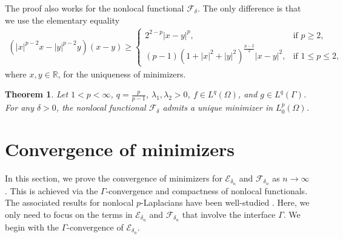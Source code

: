 \documentclass{article}
\newcommand{\R}{\mathbb{R}}
\newtheorem{theorem}{Theorem}
\theoremstyle{definition}
\begin{document}
The proof also works for the nonlocal functional $\mathcal{F}_\delta$.
The only difference is that we use the elementary equality
\begin{align*}
  (|x|^{p-2}x-|y|^{p-2}y)(x-y)\geq
  \begin{cases}
    2^{2-p}|x-y|^p, & \mbox{if } p\geq 2, \\
    (p-1)(1+|x|^2+|y|^2)^{\frac{p-2}{2}}|x-y|^2, & \mbox{if } 1\leq p\leq 2,
  \end{cases}
\end{align*}
where $x,y\in \R$,
for the uniqueness of minimizers.

\begin{theorem}
  Let $1<p<\infty$, $q=\frac{p}{p-1}$, $\lambda_1, \lambda_2>0$, $f\in L^q(\Omega)$, and $g\in L^q(\Gamma)$. For any $\delta>0$, the nonlocal functional $\mathcal{F}_\delta$ admits a unique minimizer in $L^p_0(\Omega)$.
\end{theorem}


\section{Convergence of minimizers}
In this section, we prove the convergence of minimizers for $\mathcal{E}_{\delta_n}$ and $\mathcal{F}_{\delta_n}$ as $n\rightarrow\infty$.
This is achieved via the $\Gamma$-convergence and compactness of nonlocal functionals.
The associated results for nonlocal $p$-Laplacians have been well-studied \cite{slepcev2019analysis}.
Here, we only need to focus on the terms in $\mathcal{E}_{\delta_n}$ and $\mathcal{F}_{\delta_n}$ that involve the interface $\Gamma$.
We begin with the $\Gamma$-convergence of $\mathcal{E}_{\delta_n}$.
\end{document}
